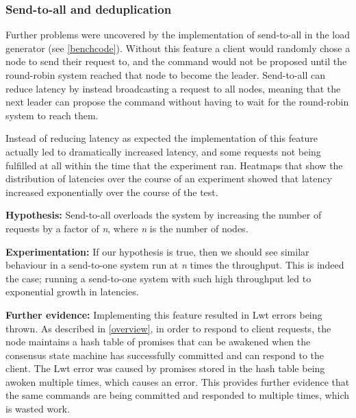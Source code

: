 \subsubsection{Send-to-all and deduplication} \label{sendtoall}
Further problems were uncovered by the implementation of send-to-all in the load generator (see \ref{benchcode}). Without this feature a client would randomly chose a node to send their request to, and the command would not be proposed until the round-robin system reached that node to become the leader. Send-to-all can reduce latency by instead broadcasting a request to all nodes, meaning that the next leader can propose the command without having to wait for the round-robin system to reach them.

Instead of reducing latency as expected the implementation of this feature actually led to dramatically increased latency, and some requests not being fulfilled at all within the time that the experiment ran. Heatmaps that show the distribution of latencies over the course of an experiment showed that latency increased exponentially over the course of the test.

\textbf{Hypothesis: } Send-to-all overloads the system by increasing the number of requests by a factor of \textit{n}, where \textit{n} is the number of nodes.

\textbf{Experimentation: } If our hypothesis is true, then we should see similar behaviour in a send-to-one system run at \textit{n} times the throughput. This is indeed the case; running a send-to-one system with such high throughput led to exponential growth in latencies.

\textbf{Further evidence: } Implementing this feature resulted in Lwt errors being thrown. As described in \ref{overview}, in order to respond to client requests, the node maintains a hash table of promises that can be awakened when the consensus state machine has successfully committed and can respond to the client. The Lwt error was caused by promises stored in the hash table being awoken multiple times, which causes an error. This provides further evidence that the same commands are being committed and responded to multiple times, which is wasted work.

